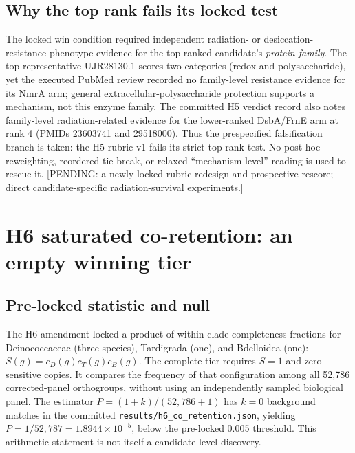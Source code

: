 \subsection{Why the top rank fails its locked test}
The locked win condition required independent radiation- or desiccation-resistance phenotype evidence for the top-ranked candidate's \emph{protein family}. The top representative UJR28130.1 scores two categories (redox and polysaccharide), yet the executed PubMed review recorded no family-level resistance evidence for its NmrA arm; general extracellular-polysaccharide protection supports a mechanism, not this enzyme family. The committed H5 verdict record also notes family-level radiation-related evidence for the lower-ranked DsbA/FrnE arm at rank 4 (PMIDs 23603741 and 29518000). Thus the prespecified falsification branch is taken: the H5 rubric v1 fails its strict top-rank test. No post-hoc reweighting, reordered tie-break, or relaxed ``mechanism-level'' reading is used to rescue it. [PENDING: a newly locked rubric redesign and prospective rescore; direct candidate-specific radiation-survival experiments.]

\section{H6 saturated co-retention: an empty winning tier}
\subsection{Pre-locked statistic and null}
The H6 amendment locked a product of within-clade completeness fractions for Deinococcaceae (three species), Tardigrada (one), and Bdelloidea (one): $S(g)=c_D(g)c_T(g)c_B(g)$. The complete tier requires $S=1$ and zero sensitive copies. It compares the frequency of that configuration among all 52,786 corrected-panel orthogroups, without using an independently sampled biological panel. The estimator $P=(1+k)/(52{,}786+1)$ has $k=0$ background matches in the committed \texttt{results/h6\_co\_retention.json}, yielding $P=1/52{,}787=1.8944\times10^{-5}$, below the pre-locked 0.005 threshold. This arithmetic statement is not itself a candidate-level discovery.
